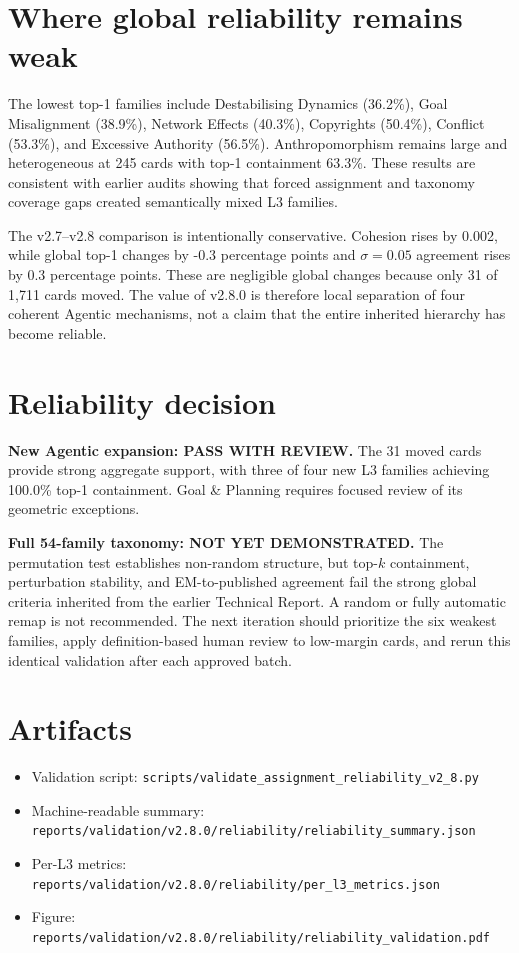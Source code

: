 \documentclass[10pt,a4paper]{article}
\newcommand{\pct}[1]{#1\%}
\begin{document}
\section{Where global reliability remains weak}
The lowest top-1 families include Destabilising Dynamics (\pct{36.2}), Goal Misalignment (\pct{38.9}), Network Effects (\pct{40.3}), Copyrights (\pct{50.4}), Conflict (\pct{53.3}), and Excessive Authority (\pct{56.5}). Anthropomorphism remains large and heterogeneous at 245 cards with top-1 containment \pct{63.3}. These results are consistent with earlier audits showing that forced assignment and taxonomy coverage gaps created semantically mixed L3 families.

The v2.7--v2.8 comparison is intentionally conservative. Cohesion rises by 0.002, while global top-1 changes by -0.3 percentage points and $\sigma=0.05$ agreement rises by 0.3 percentage points. These are negligible global changes because only 31 of 1,711 cards moved. The value of v2.8.0 is therefore local separation of four coherent Agentic mechanisms, not a claim that the entire inherited hierarchy has become reliable.

\section{Reliability decision}
\textbf{New Agentic expansion: PASS WITH REVIEW.} The 31 moved cards provide strong aggregate support, with three of four new L3 families achieving \pct{100.0} top-1 containment. Goal \& Planning requires focused review of its geometric exceptions.

\textbf{Full 54-family taxonomy: NOT YET DEMONSTRATED.} The permutation test establishes non-random structure, but top-$k$ containment, perturbation stability, and EM-to-published agreement fail the strong global criteria inherited from the earlier Technical Report. A random or fully automatic remap is not recommended. The next iteration should prioritize the six weakest families, apply definition-based human review to low-margin cards, and rerun this identical validation after each approved batch.

\section{Artifacts}
\begin{itemize}
\item Validation script: \texttt{scripts/validate\_assignment\_reliability\_v2\_8.py}
\item Machine-readable summary: \texttt{reports/validation/v2.8.0/reliability/reliability\_summary.json}
\item Per-L3 metrics: \texttt{reports/validation/v2.8.0/reliability/per\_l3\_metrics.json}
\item Figure: \texttt{reports/validation/v2.8.0/reliability/reliability\_validation.pdf}
\end{itemize}
\end{document}
